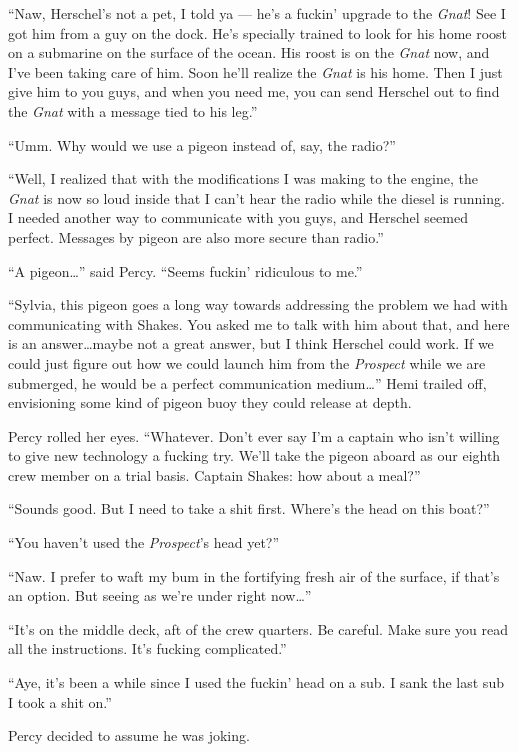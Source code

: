 \documentclass[
]{scrbook}
\begin{document}
``Naw, Herschel's not a pet, I told ya --- he's a fuckin' upgrade to the
\emph{Gnat}! See I got him from a guy on the dock. He's specially
trained to look for his home roost on a submarine on the surface of the
ocean. His roost is on the \emph{Gnat} now, and I've been taking care of
him. Soon he'll realize the \emph{Gnat} is his home. Then I just give
him to you guys, and when you need me, you can send Herschel out to find
the \emph{Gnat} with a message tied to his leg.''

``Umm. Why would we use a pigeon instead of, say, the radio?''

``Well, I realized that with the modifications I was making to the
engine, the \emph{Gnat} is now so loud inside that I can't hear the
radio while the diesel is running. I needed another way to communicate
with you guys, and Herschel seemed perfect. Messages by pigeon are also
more secure than radio.''

``A pigeon\ldots{}'' said Percy. ``Seems fuckin' ridiculous to me.''

``Sylvia, this pigeon goes a long way towards addressing the problem we
had with communicating with Shakes. You asked me to talk with him about
that, and here is an answer\ldots maybe not a great answer, but I think
Herschel could work. If we could just figure out how we could launch him
from the \emph{Prospect} while we are submerged, he would be a perfect
communication medium\ldots{}'' Hemi trailed off, envisioning some kind
of pigeon buoy they could release at depth.

Percy rolled her eyes. ``Whatever. Don't ever say I'm a captain who
isn't willing to give new technology a fucking try. We'll take the
pigeon aboard as our eighth crew member on a trial basis. Captain
Shakes: how about a meal?''

``Sounds good. But I need to take a shit first. Where's the head on this
boat?''

``You haven't used the \emph{Prospect}'s head yet?''

``Naw. I prefer to waft my bum in the fortifying fresh air of the
surface, if that's an option. But seeing as we're under right
now\ldots{}''

``It's on the middle deck, aft of the crew quarters. Be careful. Make
sure you read all the instructions. It's fucking complicated.''

``Aye, it's been a while since I used the fuckin' head on a sub. I sank
the last sub I took a shit on.''

Percy decided to assume he was joking.
\end{document}
